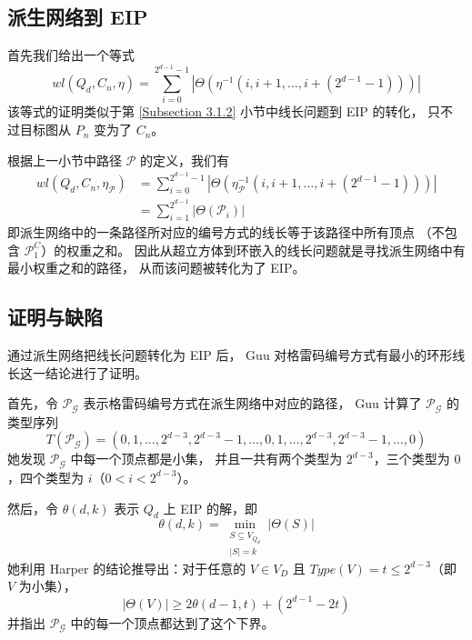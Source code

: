 \subsection{派生网络到 EIP}
\label{Subsection 3.2.2}

首先我们给出一个等式
\begin{equation*}
wl(Q_d, C_n, \eta) = \sum_{i = 0}^{2^{d - 1} - 1}
|\Theta(\eta^{-1}(i, i + 1, \dots, i + (2^{d - 1} - 1)))|
\end{equation*}
该等式的证明类似于第 \ref{Subsection 3.1.2} 小节中线长问题到 EIP 的转化，
只不过目标图从 $P_n$ 变为了 $C_n$。

根据上一小节中路径 $\mathcal{P}$ 的定义，我们有
\begin{align*}
wl(Q_d, C_n, \eta_\mathcal{P}) & = \sum_{i = 0}^{2^{d - 1} - 1}
				   |\Theta(\eta_\mathcal{P}^{-1}(i, i + 1, \dots, i + (2^{d - 1} - 1)))| \\
			       & = \sum_{i = 1}^{2^{d - 1}} |\Theta(\mathcal{P}_i)|
\end{align*}
即派生网络中的一条路径所对应的编号方式的线长等于该路径中所有顶点
（不包含 $\mathcal{P}_1^C$）的权重之和。
因此从超立方体到环嵌入的线长问题就是寻找派生网络中有最小权重之和的路径，
从而该问题被转化为了 EIP。

\subsection{证明与缺陷}
\label{Subsection 3.2.3}

通过派生网络把线长问题转化为 EIP 后，
Guu 对格雷码编号方式有最小的环形线长这一结论进行了证明。

首先，令 $\mathcal{P}_\mathcal{G}$ 表示格雷码编号方式在派生网络中对应的路径，
Guu 计算了 $\mathcal{P}_\mathcal{G}$ 的类型序列
\begin{equation*}
T(\mathcal{P}_\mathcal{G}) = (0, 1, \dots, 2^{d - 3}, 2^{d - 3} - 1, \dots, 0, 1, \dots, 2^{d - 3}, 2^{d - 3} - 1, \dots, 0)
\end{equation*}
她发现 $\mathcal{P}_\mathcal{G}$ 中每一个顶点都是小集，
并且一共有两个类型为 $2^{d - 3}$，三个类型为 $0$，四个类型为 $i$（$0 < i <2^{d - 3}$）。

然后，令 $\theta(d, k)$ 表示 $Q_d$ 上 EIP 的解，即
\begin{equation*}
\theta(d, k) = \min_{\substack{
	S \subseteq V_{Q_d} \\
	|S| = k
}} |\Theta(S)|
\end{equation*}
她利用 Harper 的结论推导出：对于任意的 $V \in V_D$ 且 $Type(V) = t \le 2^{d - 3}$（即 $V$ 为小集），
\begin{equation*}
|\Theta(V)| \ge 2 \theta(d - 1, t) + (2^{d - 1} - 2 t)
\end{equation*}
并指出 $\mathcal{P}_\mathcal{G}$ 中的每一个顶点都达到了这个下界。


